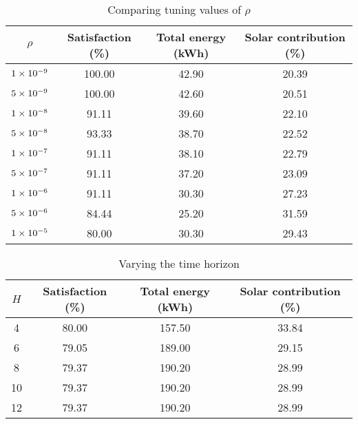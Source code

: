 \begin{table}
   \centering
   \begin{tabular}{c c c c}
      $\rho$ & Satisfaction (\%) & Total energy (kWh) & Solar contribution (\%) \\ \hline
      $1\times 10^{-9}$ & 100.00 & 42.90 & 20.39 \\
      $5\times 10^{-9}$ & 100.00 & 42.60 & 20.51 \\
      $1\times 10^{-8}$ & 91.11 & 39.60 & 22.10 \\
      $5\times 10^{-8}$ & 93.33 & 38.70 & 22.52 \\
      $1\times 10^{-7}$ & 91.11 & 38.10 & 22.79 \\
      $5\times 10^{-7}$ & 91.11 & 37.20 & 23.09 \\
      $1\times 10^{-6}$ & 91.11 & 30.30 & 27.23 \\
      $5\times 10^{-6}$ & 84.44 & 25.20 & 31.59 \\
      $1\times 10^{-5}$ & 80.00 & 30.30 & 29.43 \\
   \end{tabular}
   \caption{Comparing tuning values of $\rho$}
   \label{tab:rho}
\end{table}

\begin{table}
   \centering
   \begin{tabular}{c c c c}
      $H$ & Satisfaction (\%) & Total energy (kWh) & Solar contribution (\%) \\ \hline
		4 & 80.00 & 157.50 & 33.84 \\
		6 & 79.05 & 189.00 & 29.15 \\
		8 & 79.37 & 190.20 & 28.99 \\
		10 & 79.37 & 190.20 & 28.99 \\
		12 & 79.37 & 190.20 & 28.99
   \end{tabular}
   \caption{Varying the time horizon}
   \label{tab:H}
\end{table}

